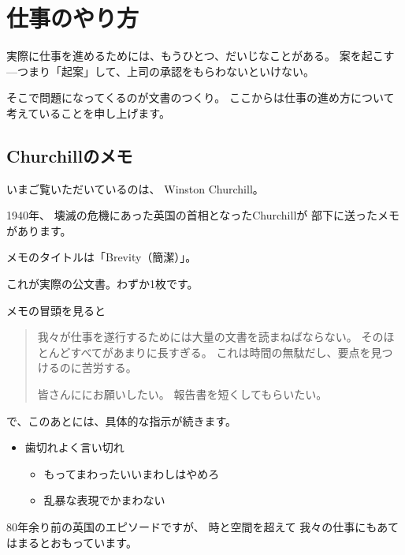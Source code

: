 \documentclass[uplatex,jis2004,dvipdfmx,12pt]{jsarticle}
\begin{document}
\section{仕事のやり方}


実際に仕事を進めるためには、もうひとつ、だいじなことがある。
案を起こす---つまり「起案」して、上司の承認をもらわないといけない。

そこで問題になってくるのが文書のつくり。
ここからは仕事の進め方について考えていることを申し上げます。

\subsection{Churchillのメモ}

いまご覧いただいているのは、
Winston Churchill。

1940年、
壊滅の危機にあった英国の首相となったChurchillが
部下に送ったメモがあります。

メモのタイトルは「Brevity（簡潔）」。

これが実際の公文書。わずか1枚です。

メモの冒頭を見ると

\begin{quote}
我々が仕事を遂行するためには大量の文書を読まねばならない。
そのほとんどすべてがあまりに長すぎる。
これは時間の無駄だし、要点を見つけるのに苦労する。

皆さんににお願いしたい。
報告書を短くしてもらいたい。
\end{quote}

で、このあとには、具体的な指示が続きます。
\begin{itemize}
 \item 歯切れよく言い切れ
       \begin{itemize}
       \item もってまわったいいまわしはやめろ
       \item 乱暴な表現でかまわない
       \end{itemize}

\end{itemize}




80年余り前の英国のエピソードですが、
時と空間を超えて
我々の仕事にもあてはまるとおもっています。
\end{document}
